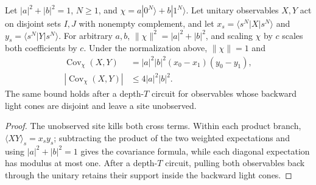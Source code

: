 \begin{lemma}
    \label{thm:ldp_weighted_ghz_covariance}
    \leanok
    Let $|a|^2+|b|^2=1$, $N\ge1$, and
    $\chi=a|0^N\rangle+b|1^N\rangle$.
    Let unitary observables $X,Y$ act on disjoint sets $I,J$ with
    nonempty complement, and let $x_s=\langle s^N|X|s^N\rangle$ and
    $y_s=\langle s^N|Y|s^N\rangle$. For arbitrary $a,b$, $\|\chi\|^2=|a|^2+|b|^2$, and scaling $\chi$
    by $c$ scales both coefficients by $c$. Under the normalization above,
    $\|\chi\|=1$ and
    \begin{align}
        \operatorname{Cov}_\chi(X,Y)
                                       & =|a|^2|b|^2(x_0-x_1)(y_0-y_1), \\
        |\operatorname{Cov}_\chi(X,Y)| & \le4|a|^2|b|^2.
    \end{align}
    The same bound holds after a depth-$T$ circuit for observables whose
    backward light cones are disjoint and leave a site unobserved.
\end{lemma}
\begin{proof}
    \leanok
    The unobserved site kills both cross terms. Within each product branch,
    $\langle XY\rangle_s=x_sy_s$; subtracting the product of the two weighted
    expectations and using $|a|^2+|b|^2=1$ gives the covariance formula, while
    each diagonal expectation has modulus at most one. After a depth-$T$
    circuit, pulling both observables back through the unitary retains their
    support inside the backward light cones.
\end{proof}

